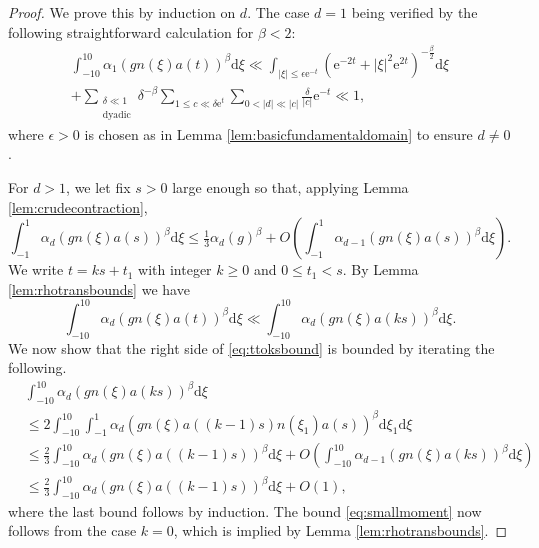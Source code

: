 \documentclass[12pt]{amsart}
\theoremstyle{definition}
\theoremstyle{remark}
\numberwithin{equation}{section}
\newcommand{\dd}{\mathrm{d}}
\newcommand{\e}{\mathrm{e}}
\begin{document}
\begin{proof}
  We prove this by induction on $d$.
  The case $d = 1$ being verified by the following straightforward calculation for $\beta < 2$:
  \begin{multline}
    \label{eq:d1smallmoment}
    \int_{-10}^{10} \alpha_1(gn(\xi) a(t))^\beta \dd \xi \ll \int_{|\xi| \leq \epsilon \e^{-t}} ( \e^{-2t} + |\xi|^2 \e^{2t})^{-\frac{\beta}{2}} \dd \xi \\
    + \sum_{\substack{\delta \ll 1 \\ \mathrm{dyadic}}} \delta^{-\beta} \sum_{1 \leq  c \ll \delta \e^t} \sum_{ 0 < |d| \ll |c|} \tfrac{\delta}{|c|} \e^{-t} \ll 1,
  \end{multline}
  where $\epsilon> 0$ is chosen as in Lemma \ref{lem:basicfundamentaldomain} to ensure $d \neq 0$. 

  For $d > 1$, we let fix $s > 0$ large enough so that, applying Lemma \ref{lem:crudecontraction},
  \begin{equation}
    \label{eq:sfixeddef}
    \int_{-1}^1 \alpha_d(gn(\xi)a(s))^\beta \dd \xi \leq \tfrac{1}{3} \alpha_d(g)^\beta + O( \int_{-1}^1 \alpha_{d-1}(gn(\xi)a(s))^\beta \dd \xi). 
  \end{equation}
  We write $t = ks + t_1$ with integer $k\geq 0$ and $0\leq t_1 < s$.
  By Lemma \ref{lem:rhotransbounds} we have
  \begin{equation}
    \label{eq:ttoksbound}
    \int_{-10}^{10} \alpha_d(gn(\xi) a(t))^\beta \dd \xi \ll \int_{-10}^{10} \alpha_d(gn(\xi) a(ks))^\beta \dd \xi.
  \end{equation}
  We now show that the right side of \eqref{eq:ttoksbound} is bounded by iterating the following.
  \begin{equation}
  \begin{split}
    \label{eq:contractioniteration}
&    \int_{-10}^{10} \alpha_d(gn(\xi) a(ks))^\beta \dd \xi \\
 &   \leq 2 \int_{-10}^{10} \int_{-1}^1 \alpha_d(gn(\xi) a((k-1)s)n(\xi_1)a(s))^\beta \dd \xi_1 \dd \xi \\
  &  \leq \tfrac{2}{3} \int_{-10}^{10} \alpha_d(gn(\xi) a((k-1)s))^\beta \dd \xi + O( \int_{-10}^{10} \alpha_{d-1}(gn(\xi) a(ks))^\beta \dd \xi) \\
  &  \leq \tfrac{2}{3} \int_{-10}^{10} \alpha_d(gn(\xi) a((k-1)s))^\beta \dd \xi + O( 1),
  \end{split}
  \end{equation}
  where the last bound follows by induction.
  The bound \eqref{eq:smallmoment} now follows from the case $k=0$, which is implied by Lemma \ref{lem:rhotransbounds}. 
  \end{proof}
\end{document}
